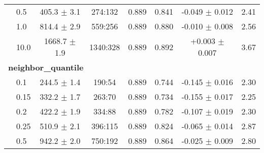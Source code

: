 \begin{table}[htbp]
\begin{tabular}{llcccccc}
  & 0.5 & 405.3 $\pm$ 3.1 & 274:132 & 0.889 & 0.841 & -0.049 $\pm$ 0.012 & 2.41 \\
  & 1.0 & 814.4 $\pm$ 2.9 & 559:256 & 0.889 & 0.880 & -0.010 $\pm$ 0.008 & 2.56 \\
  & 10.0 & 1668.7 $\pm$ 1.9 & 1340:328 & 0.889 & 0.892 & +0.003 $\pm$ 0.007 & 3.67 \\
\hline
\multicolumn{8}{l}{\textbf{neighbor\_quantile}} \\
  & 0.1 & 244.5 $\pm$ 1.4 & 190:54 & 0.889 & 0.744 & -0.145 $\pm$ 0.016 & 2.30 \\
  & 0.15 & 332.2 $\pm$ 1.7 & 263:70 & 0.889 & 0.734 & -0.155 $\pm$ 0.017 & 2.25 \\
  & 0.2 & 422.2 $\pm$ 1.9 & 334:88 & 0.889 & 0.782 & -0.107 $\pm$ 0.019 & 2.30 \\
  & 0.25 & 510.9 $\pm$ 2.1 & 396:115 & 0.889 & 0.824 & -0.065 $\pm$ 0.014 & 2.87 \\
  & 0.5 & 942.2 $\pm$ 2.0 & 750:192 & 0.889 & 0.864 & -0.025 $\pm$ 0.009 & 2.80 \\

\hline
\end{tabular}
\end{table}